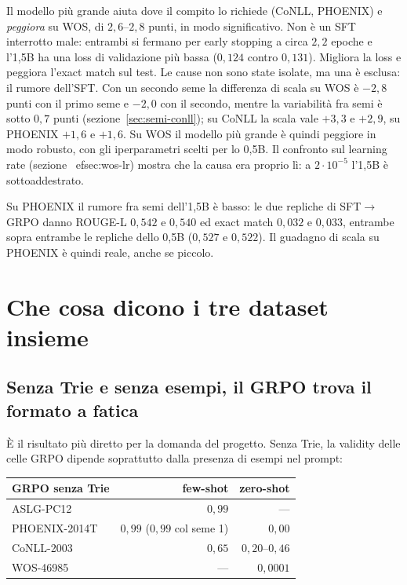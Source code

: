 Il modello più grande aiuta dove il compito lo richiede (CoNLL, PHOENIX) e
\emph{peggiora} su WOS, di $2{,}6$--$2{,}8$ punti, in modo significativo. Non è
un SFT interrotto male: entrambi si fermano per early stopping a circa $2{,}2$
epoche e l'1,5B ha una loss di validazione più bassa ($0{,}124$ contro
$0{,}131$). Migliora la loss e peggiora l'exact match sul test. Le cause non
sono state isolate, ma una è esclusa: il rumore dell'SFT. Con un secondo seme
la differenza di scala su WOS è $-2{,}8$ punti con il primo seme e $-2{,}0$ con il
secondo, mentre la variabilità fra semi è sotto $0{,}7$ punti
(sezione~\ref{sec:semi-conll}); su CoNLL la scala vale $+3{,}3$ e $+2{,}9$, su
PHOENIX $+1{,}6$ e $+1{,}6$. Su WOS il modello più grande è quindi peggiore in
modo robusto, con gli iperparametri scelti per lo 0,5B. Il confronto sul
learning rate (sezione~
ef{sec:wos-lr}) mostra che la causa era proprio lì: a
$2\cdot 10^{-5}$ l'1,5B è sottoaddestrato.

Su PHOENIX il rumore fra semi dell'1,5B è basso: le due repliche di
SFT$\to$GRPO danno ROUGE-L $0{,}542$ e $0{,}540$ ed exact match $0{,}032$ e
$0{,}033$, entrambe sopra entrambe le repliche dello 0,5B ($0{,}527$ e
$0{,}522$). Il guadagno di scala su PHOENIX è quindi reale, anche se piccolo.

\section{Che cosa dicono i tre dataset insieme}
\label{sec:osservazioni-altri}

\subsection{Senza Trie e senza esempi, il GRPO trova il formato a fatica}

È il risultato più diretto per la domanda del progetto. Senza Trie, la validity
delle celle GRPO dipende soprattutto dalla presenza di esempi nel prompt:

\begin{center}
\small
\begin{tabular}{lrr}
\toprule
GRPO senza Trie & few-shot & zero-shot \\
\midrule
ASLG-PC12     & $0{,}99$ & --- \\
PHOENIX-2014T & $0{,}99$ ($0{,}99$ col seme 1) & $0{,}00$ \\
CoNLL-2003    & $0{,}65$ & $0{,}20$--$0{,}46$ \\
WOS-46985     & ---      & $0{,}0001$ \\
\bottomrule
\end{tabular}
\end{center}

